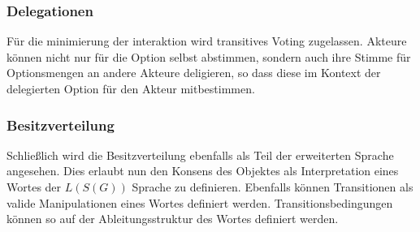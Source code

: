 \documentclass[]{article}
\begin{document}



\subsubsection*{Delegationen}

Für die minimierung der interaktion wird transitives Voting zugelassen. Akteure können nicht nur für die Option selbst abstimmen, sondern auch ihre Stimme für Optionsmengen an andere Akteure deligieren, so dass diese im Kontext der delegierten Option für den Akteur mitbestimmen.





\subsubsection*{Besitzverteilung}

Schließlich wird die Besitzverteilung ebenfalls als Teil der erweiterten Sprache angesehen. Dies erlaubt nun den Konsens des Objektes als Interpretation eines Wortes der $L(S(G))$ Sprache zu definieren. Ebenfalls können Transitionen als valide Manipulationen eines Wortes definiert werden. Transitionsbedingungen können so auf der Ableitungsstruktur des Wortes definiert werden.
\end{document}
